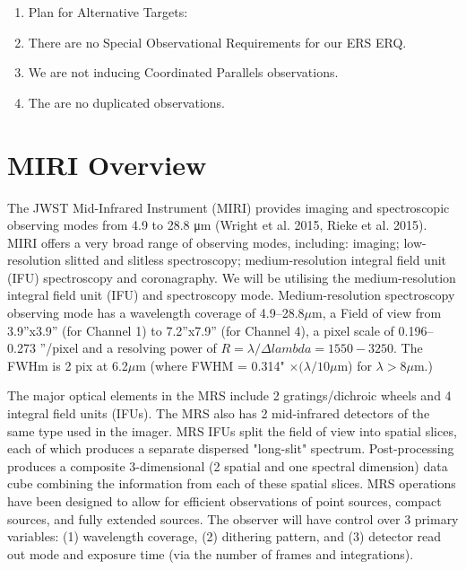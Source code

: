 \smallskip \smallskip
\noindent

\begin{enumerate}[label=\alph*]
    \item{Plan for Alternative Targets: }
    \item{There are no Special Observational Requirements for our ERS ERQ.} 
    \item{We are not inducing Coordinated Parallels observations.}
    \item{The are no duplicated observations.} 
\end{enumerate}

\section{MIRI Overview}
The JWST Mid-Infrared Instrument (MIRI) provides imaging and
spectroscopic observing modes from 4.9 to 28.8 μm (Wright et al. 2015,
Rieke et al. 2015). MIRI offers a very broad range of observing modes,
including: imaging; low-resolution slitted and slitless spectroscopy;
medium-resolution integral field unit (IFU) spectroscopy and
coronagraphy.  We will be utilising the medium-resolution integral
field unit (IFU) and spectroscopy mode.  Medium-resolution
spectroscopy observing mode has a wavelength coverage of
4.9–28.8$\mu$m, a Field of view from 3.9''x3.9'' (for Channel 1) to
7.2''x7.9'' (for Channel 4), a pixel scale of 0.196–0.273 ''/pixel and
a resolving power of $R=\lambda / \Delta lambda = 1550-3250$.  The
FWHm is 2 pix at 6.2$\mu$m (where FWHM = 0.314" $\times (\lambda / 10
\mu$m) for $\lambda > 8\mu$m.)

\smallskip \smallskip
\noindent
The major optical elements in the MRS include 2 gratings/dichroic
wheels and 4 integral field units (IFUs). The MRS also has 2
mid-infrared detectors of the same type used in the imager.  MRS IFUs
split the field of view into spatial slices, each of which produces a
separate dispersed "long-slit" spectrum. Post-processing produces a
composite 3-dimensional (2 spatial and one spectral dimension) data
cube combining the information from each of these spatial slices.  MRS
operations have been designed to allow for efficient observations of
point sources, compact sources, and fully extended sources. The
observer will have control over 3 primary variables: (1) wavelength
coverage, (2) dithering pattern, and (3) detector read out mode and
exposure time (via the number of frames and integrations).

